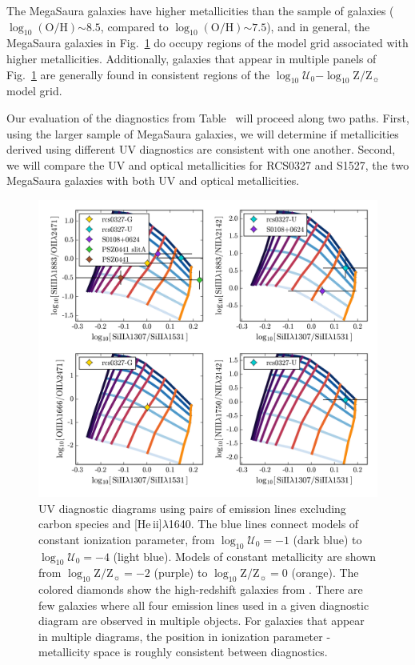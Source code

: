 \documentclass[preprint2]{aastex62}
\newcommand{\heii}{[He\,{\sc ii}]\xspace}
\newcommand{\logten}{\ensuremath{\log_{10}}}
\newcommand{\logZ}{\ensuremath{\logten \mathrm{Z}/\mathrm{Z}_{\sun}}\xspace}
\newcommand{\logOH}{\ensuremath{\logten (\mathrm{O}/\mathrm{H})}\xspace}
\newcommand{\logZeq}[1]{\ensuremath{\logten \mathrm{Z}/\mathrm{Z}_{\sun} = #1}}
\newcommand{\logU}{\ensuremath{\logten \mathcal{U}_0}}
\newcommand{\logUeq}[1]{\ensuremath{\logten \mathcal{U}_0 = #1}}
\newcommand{\mage}{{\sc Meg}a{\sc S}a{\sc ura}\xspace}
\newcommand{\XXX}{{\bf \color{red}{XXX} }}
\begin{document}
The \mage galaxies have higher metallicities than the \citet{Berg+2016} sample of galaxies (\logOH${\sim}8.5$, compared to \logOH${\sim}7.5$), and in general, the \mage galaxies in Fig.~\ref{fig:UVSiO} do occupy regions of the model grid associated with higher metallicities. Additionally, galaxies that appear in multiple panels of Fig.~\ref{fig:UVSiO} are generally found in consistent regions of the \logU$-$\logZ model grid. 

Our evaluation of the diagnostics from Table~\XXX will proceed along two paths. First, using the larger sample of \mage galaxies, we will determine if metallicities derived using different UV diagnostics are consistent with one another. Second, we will compare the UV and optical metallicities for RCS0327 and S1527, the two \mage galaxies with both UV and optical metallicities.

\begin{figure}
  \begin{center}
    \includegraphics[width=\linewidth]{figs/f5.png}
    \caption{UV diagnostic diagrams using pairs of emission lines excluding carbon species and \heii$\lambda$1640.  The blue lines connect models of constant ionization parameter, from \logUeq{-1} (dark blue) to \logUeq{-4} (light blue). Models of constant metallicity are shown from \logZeq{-2} (purple) to \logZeq{0} (orange). The colored diamonds show the high-redshift galaxies from \citet{Rigby+2018b}. There are few galaxies where all four emission lines used in a given diagnostic diagram are observed in multiple objects. For galaxies that appear in multiple diagrams, the position in ionization parameter - metallicity space is roughly consistent between diagnostics.}
    \label{fig:UVSiO}
  \end{center}
\end{figure}
\end{document}
